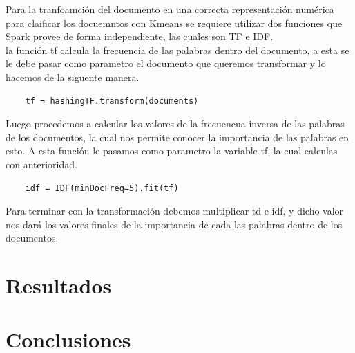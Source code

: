 \documentclass[conference,compsoc]{IEEEtran}
\begin{document}
Para la tranfoamción del documento en una correcta representación numérica para
claificar los docuemntos con Kmeans se requiere utilizar dos funciones que
Spark provee de forma independiente, las cuales son TF e IDF.\\

la función tf calcula la frecuencia de las palabras dentro del documento, a
esta se le debe pasar como parametro el documento que queremos transformar y lo
hacemos de la siguente manera.\\

\begin{lstlisting}
    tf = hashingTF.transform(documents)
\end{lstlisting}

\vspace{0.5cm}

Luego procedemos a calcular los valores de la frecuencua inversa de las
palabras de los documentos, la cual nos permite conocer la importancia de las
palabras en esto. A esta función le pasamos como parametro la variable tf, la
cual calculas con anterioridad.\\

\begin{lstlisting}
    idf = IDF(minDocFreq=5).fit(tf)
\end{lstlisting}

\vspace{0.5cm}

Para terminar con la transformación debemos multiplicar td e idf, y dicho valor
nos dará los valores finales de la importancia de cada las palabras dentro de
los documentos.

\section{Resultados}


\section{Conclusiones}




\end{document}
